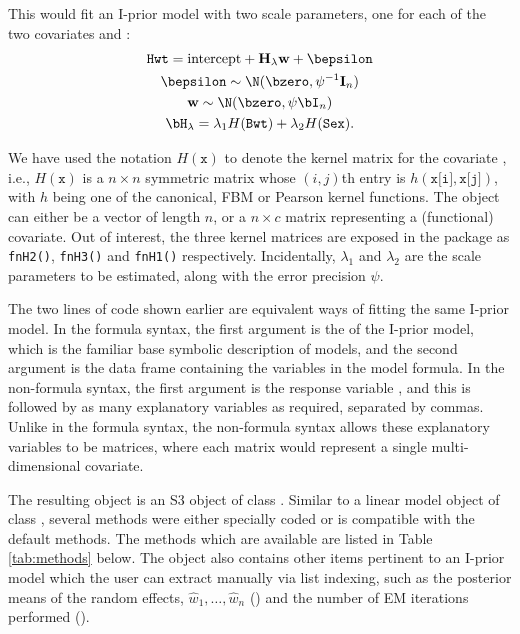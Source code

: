 This would fit an I-prior model with two scale parameters, one for each of the two covariates  and :
\begin{align*}
\begin{gathered}
  \texttt{Hwt} = \text{intercept} + \mathbf H_\lambda\mathbf w + \bepsilon \\
  \bepsilon \sim \N(\bzero, \psi^{-1}\mathbf I_n) \\
  \mathbf w \sim \N(\bzero, \psi\bI_n) \\
  \bH_\lambda = \lambda_1 H(\texttt{Bwt}) + \lambda_2 H(\texttt{Sex}).
\end{gathered}
\end{align*}

We have used the notation $H(\texttt{x})$ to denote the kernel matrix for the covariate , i.e., $H(\texttt{x})$ is a $n \times n$ symmetric matrix whose $(i,j)$th entry is $h(\texttt{x[i]}, \texttt{x[j]})$, with $h$ being one of the canonical, FBM or Pearson kernel functions. The object  can either be a vector of length $n$, or a $n \times c$ matrix representing a (functional) covariate. Out of interest, the three kernel matrices are exposed in the  package as \texttt{fnH2()}, \texttt{fnH3()} and \texttt{fnH1()} respectively. Incidentally, $\lambda_1$ and $\lambda_2$ are the scale parameters to be estimated, along with the error precision $\psi$.

The two lines of code shown earlier are equivalent ways of fitting the same I-prior model. In the formula syntax, the first argument is the  of the I-prior model, which is the familiar base  symbolic description of models, and the second argument is the data frame containing the variables in the model formula. In the non-formula syntax, the first argument is the response variable , and this is followed by as many explanatory variables as required, separated by commas. Unlike in the formula syntax, the non-formula syntax allows these explanatory variables to be matrices, where each matrix would represent a single multi-dimensional covariate.

The resulting object  is an S3 object of class . Similar to a linear model object of class , several methods were either specially coded or is compatible with the default  methods. The methods which are available are listed in Table \ref{tab:methods} below. The object  also contains other items pertinent to an I-prior model which the user can extract manually via list indexing, such as the posterior means of the random effects, $\hat w_1, \dots, \hat w_n$ () and the number of EM iterations performed ().


